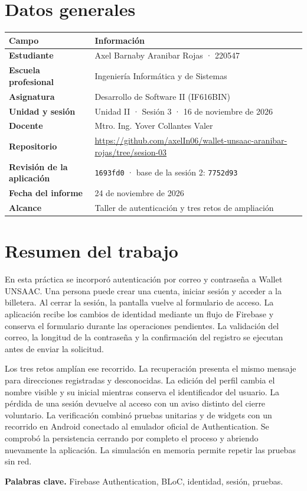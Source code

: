 \documentclass[11pt,letterpaper]{article}
\makeatletter
\newcommand{\tabla}[2]{\par\smallskip\begin{tabularx}{\linewidth}{@{}>{\bfseries\color{vino}}p{.28\linewidth}X@{}}\toprule\rowcolor{rosa}#1\\\midrule #2\bottomrule\end{tabularx}\par}
\makeatother
\begin{document}
\section{Datos generales}
\tabla{Campo & Información}{Estudiante & Axel Barnaby Aranibar Rojas · 220547\\Escuela profesional & Ingeniería Informática y de Sistemas\\Asignatura & Desarrollo de Software II (IF616BIN)\\Unidad y sesión & Unidad II · Sesión 3 · 16 de noviembre de 2026\\Docente & Mtro. Ing. Yover Collantes Valer\\Repositorio & \url{https://github.com/axelIn06/wallet-unsaac-aranibar-rojas/tree/sesion-03}\\Revisión de la aplicación & \texttt{1693fd0} · base de la sesión 2: \texttt{7752d93}\\Fecha del informe & 24 de noviembre de 2026\\Alcance & Taller de autenticación y tres retos de ampliación\\}
\section{Resumen del trabajo}
En esta práctica se incorporó autenticación por correo y contraseña a Wallet UNSAAC. Una persona puede crear una cuenta, iniciar sesión y acceder a la billetera. Al cerrar la sesión, la pantalla vuelve al formulario de acceso. La aplicación recibe los cambios de identidad mediante un flujo de Firebase y conserva el formulario durante las operaciones pendientes. La validación del correo, la longitud de la contraseña y la confirmación del registro se ejecutan antes de enviar la solicitud.

Los tres retos amplían ese recorrido. La recuperación presenta el mismo mensaje para direcciones registradas y desconocidas. La edición del perfil cambia el nombre visible y su inicial mientras conserva el identificador del usuario. La pérdida de una sesión devuelve al acceso con un aviso distinto del cierre voluntario. La verificación combinó pruebas unitarias y de widgets con un recorrido en Android conectado al emulador oficial de Authentication. Se comprobó la persistencia cerrando por completo el proceso y abriendo nuevamente la aplicación. La simulación en memoria permite repetir las pruebas sin red.

\textbf{Palabras clave.} Firebase Authentication, BLoC, identidad, sesión, pruebas.
\newpage
\end{document}
